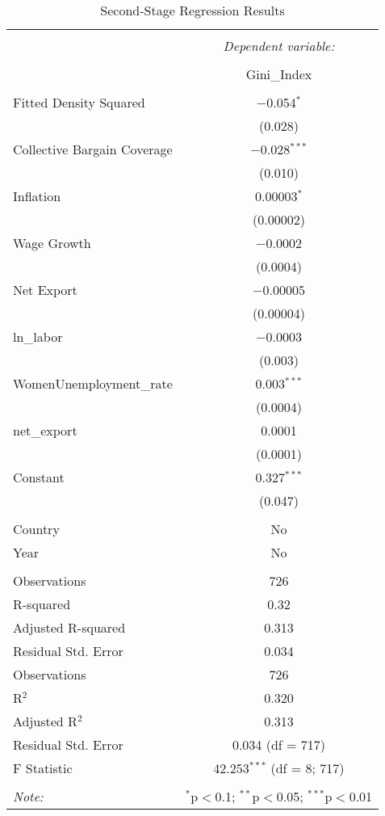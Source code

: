
\begin{table}[!htbp] \centering 
  \caption{Second-Stage Regression Results} 
  \label{} 
\begin{tabular}{@{\extracolsep{5pt}}lc} 
\\[-1.8ex]\hline 
\hline \\[-1.8ex] 
 & \multicolumn{1}{c}{\textit{Dependent variable:}} \\ 
\cline{2-2} 
\\[-1.8ex] & Gini\_Index \\ 
\hline \\[-1.8ex] 
 Fitted Density Squared & $-$0.054$^{*}$ \\ 
  & (0.028) \\ 
  Collective Bargain Coverage & $-$0.028$^{***}$ \\ 
  & (0.010) \\ 
  Inflation & 0.00003$^{*}$ \\ 
  & (0.00002) \\ 
  Wage Growth & $-$0.0002 \\ 
  & (0.0004) \\ 
  Net Export & $-$0.00005 \\ 
  & (0.00004) \\ 
  ln\_labor & $-$0.0003 \\ 
  & (0.003) \\ 
  WomenUnemployment\_rate & 0.003$^{***}$ \\ 
  & (0.0004) \\ 
  net\_export & 0.0001 \\ 
  & (0.0001) \\ 
  Constant & 0.327$^{***}$ \\ 
  & (0.047) \\ 
 \hline \\[-1.8ex] 
Country & No \\ 
Year & No \\ 
\hline \\[-1.8ex] 
Observations & 726 \\ 
R-squared & 0.32 \\ 
Adjusted R-squared & 0.313 \\ 
Residual Std. Error & 0.034 \\ 
Observations & 726 \\ 
R$^{2}$ & 0.320 \\ 
Adjusted R$^{2}$ & 0.313 \\ 
Residual Std. Error & 0.034 (df = 717) \\ 
F Statistic & 42.253$^{***}$ (df = 8; 717) \\ 
\hline 
\hline \\[-1.8ex] 
\textit{Note:}  & \multicolumn{1}{r}{$^{*}$p$<$0.1; $^{**}$p$<$0.05; $^{***}$p$<$0.01} \\ 
\end{tabular} 
\end{table} 
